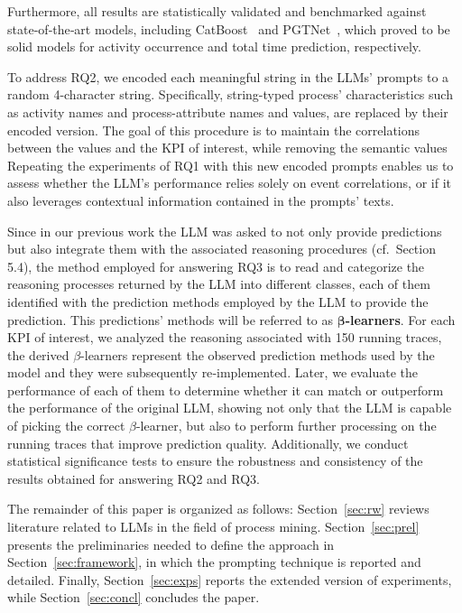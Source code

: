 \documentclass[manuscript,screen,review]{acmart}
\begin{document}
Furthermore, all results are statistically validated and benchmarked against state‑of‑the‑art models, including CatBoost~\cite{CatBoost} and PGTNet~\cite{DBLP:conf/caise/ElyasiAS24}, which proved to be solid models for activity occurrence and total time prediction, respectively.

To address RQ2, we encoded each meaningful string in the LLMs' prompts to a random 4-character string. Specifically, string-typed process' characteristics such as activity names and process-attribute names and values, are replaced by their encoded version. The goal of this procedure is to maintain the correlations between the values and the KPI of interest, while removing the semantic values%
Repeating the experiments of RQ1 with this new encoded prompts enables us to assess whether the LLM’s performance relies solely on event correlations, or if it also leverages contextual information contained in the prompts' texts.

Since in our previous work the LLM was asked to not only provide predictions but also integrate them with the associated reasoning procedures (cf.\ Section 5.4), the method employed for answering RQ3 is to read and categorize the reasoning processes returned by the LLM into different classes, each of them identified with the prediction methods employed by the LLM to provide the prediction. This predictions' methods will be referred to as $\boldsymbol{\beta}$\textbf{-learners}. %
For each KPI of interest, we analyzed the reasoning associated with 150 running traces, the derived $\beta$-learners represent the observed prediction methods used by the model and they were subsequently re‑implemented. Later, we evaluate the performance of each of them to determine whether it can match or outperform the performance of the original LLM, showing not only that the LLM is capable of picking the correct $\beta$-learner, but also to perform further processing on the running traces that improve prediction quality. Additionally, we conduct statistical significance tests to ensure the robustness and consistency of the results obtained for answering RQ2 and RQ3.

The remainder of this paper is organized as follows: Section~\ref{sec:rw} reviews literature related to LLMs in the field of process mining. Section~\ref{sec:prel} presents the preliminaries needed to define the approach in Section~\ref{sec:framework}, in which the prompting technique is reported and detailed. Finally, Section~\ref{sec:exps} reports the extended version of experiments, while Section~\ref{sec:concl} concludes the paper.
\end{document}
